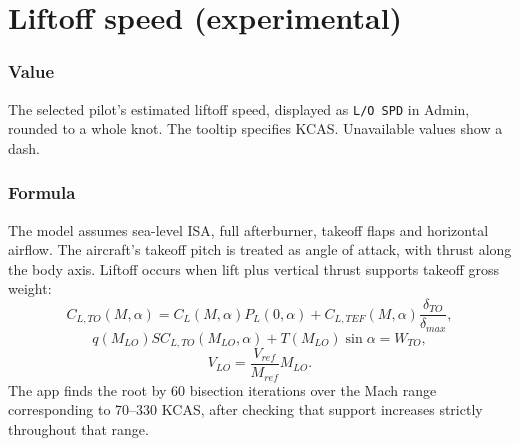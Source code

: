 \documentclass[10pt,a4paper]{amsart}
\begin{document}
\section{Liftoff speed (experimental)}\label{sec:takeoff}
\subsubsection*{Value}
The selected pilot's estimated liftoff speed, displayed as \texttt{L/O SPD}
in Admin, rounded to a whole knot. The tooltip specifies KCAS.
Unavailable values show a dash.

\subsubsection*{Formula}
The model assumes sea-level ISA, full afterburner, takeoff flaps and
horizontal airflow. The aircraft's takeoff pitch is treated as
angle of attack, with thrust along the body axis. Liftoff occurs when
lift plus vertical thrust supports takeoff gross weight:
\[
 C_{L,TO}(M,\alpha)=C_L(M,\alpha)P_L(0,\alpha)
   +C_{L,TEF}(M,\alpha)\frac{\delta_{TO}}{\delta_{max}},\]
\[ q(M_{LO})S C_{L,TO}(M_{LO},\alpha)
   +T(M_{LO})\sin\alpha=W_{TO},\]
\[V_{LO}=\frac{V_{ref}}{M_{ref}}M_{LO}.\]
The app finds the root by 60 bisection iterations over the Mach range
corresponding to 70--330 KCAS, after checking that support increases
strictly throughout that range.
\end{document}
